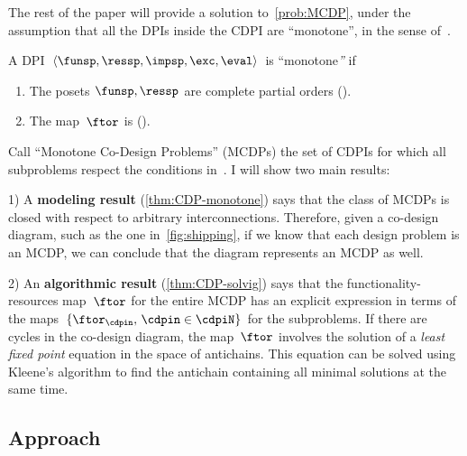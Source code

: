 
The rest of the paper will provide a solution to~\cref{prob:MCDP},
under the assumption that all the DPIs inside the CDPI are ``monotone'',
in the sense of~.
\begin{definition}
\label{def:DPI-monotone}A DPI $\left\langle \funsp,\ressp,\impsp,\exc,\eval\right\rangle $
is ``monotone\emph{''} if
\begin{enumerate}
\item The posets $\funsp,\ressp$ are complete partial orders ().
\item The map~$\ftor$ is \scottcontinuous ().
\end{enumerate}
\end{definition}


Call ``Monotone Co-Design Problems'' (MCDPs) the set of CDPIs for
which all subproblems respect the conditions in~.
 I will show two main results:

1) A \textbf{modeling result} (\cref{thm:CDP-monotone})
says that the class of MCDPs is closed with respect to arbitrary interconnections.
Therefore, given a co-design diagram, such as the one in~\cref{fig:shipping},
if we know that each design problem is an MCDP, we can conclude that
the diagram represents an MCDP as well.

2) An \textbf{algorithmic result }(\cref{thm:CDP-solvig})
says that the functionality-resources map~$\ftor$ for the entire
MCDP has an explicit expression in terms of the maps~$\{\ftor_{\cdpin},\,\cdpin\in\cdpiN\}$
for the subproblems. If there are cycles in the co-design diagram,
the map~$\ftor$ involves the solution of a\emph{ least fixed point}
equation in the space of antichains. This equation can be solved using
Kleene's algorithm to find the antichain containing all minimal solutions
at the same time.

\subsection{Approach}

